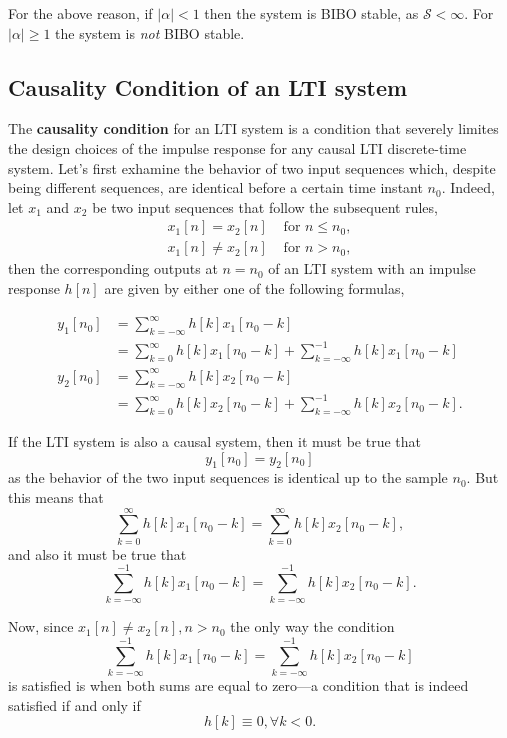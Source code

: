 \documentclass[\documentfontsize, twocolumn]{\classname}
\begin{document}
For the above reason, if $|\alpha| < 1$ then the system is BIBO stable, as $\mathcal S < \infty$. For $|\alpha| \geq 1$ the system is \emph{not} BIBO stable.

\subsection{Causality Condition of an LTI system}

The \textbf{causality condition} for an LTI system is a condition that severely limites the design choices of the impulse response for any causal LTI discrete-time system. Let's first exhamine the behavior of two input sequences which, despite being different sequences, are identical before a certain time instant $n_0$. Indeed, let $x_1$ and $x_2$ be two input sequences that follow the subsequent rules,
\begin{align*}
    x_1[n] = x_2[n] &\mbox{ for } n \leq n_0,\\
    x_1[n] \neq x_2[n] &\mbox{ for } n > n_0,
\end{align*}
then the corresponding outputs at $n=n_0$ of an LTI system with an impulse response $h[n]$ are given by either one of the following formulas,

\begin{align*}
    y_1[n_0] &= \sum_{k=-\infty}^\infty h[k]x_1[n_0 - k]\\
             &= \sum_{k=0}^\infty h[k]x_1[n_0 - k] + \sum_{k=-\infty}^{-1} h[k]x_1[n_0 - k]\\
    y_2[n_0] &= \sum_{k=-\infty}^\infty h[k]x_2[n_0 - k]\\
             &= \sum_{k=0}^\infty h[k]x_2[n_0 - k] + \sum_{k=-\infty}^{-1} h[k]x_2[n_0 - k].
\end{align*}

If the LTI system is also a causal system, then it must be true that
\[ y_1[n_0] = y_2[n_0] \]
as the behavior of the two input sequences is identical up to the sample $n_0$. But this means that
\[
    \sum_{k=0}^\infty h[k] x_1[n_0 - k] = \sum_{k=0}^\infty h[k]x_2[n_0 - k],
\]
and also it must be true that
\[
    \sum_{k=-\infty}^{-1} h[k] x_1[n_0 - k] = \sum_{k=-\infty}^{-1} h[k]x_2[n_0 - k].
\]

Now, since $x_1[n] \neq x_2[n], n> n_0$ the only way the condition
\[
    \sum_{k=-\infty}^{-1} h[k] x_1[n_0 - k] = \sum_{k=-\infty}^{-1} h[k]x_2[n_0 - k]
\]
is satisfied is when both sums are equal to zero---a condition that is indeed satisfied if and only if
\begin{equation}\label{eqn:causalityConditionLTI}
    h[k] \equiv 0, \forall k < 0.
\end{equation}
\end{document}
